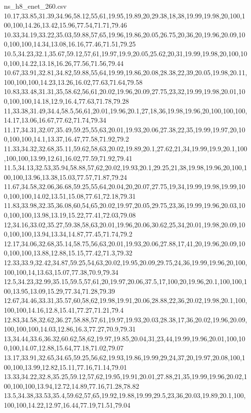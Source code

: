 \begin{filecontents*}[overwrite]{ns_h8_enet_260.csv}
10.17,33.85,31.39,34.96,58.12,55,61,19.95,19.89,20,29.38,18,38,19.99,19.98,20,100,100,100,14.26,13.42,15.96,77.54,71.71,79.46
10.33,34.19,33.22,35.03,59.88,57,65,19.96,19.86,20.05,26.75,20,36,20,19.96,20.09,100,100,100,14.34,13.08,16.16,77.46,71.51,79.25
10.5,34.23,32.1,35.67,59.12,57,61,19.97,19.9,20.05,25.62,20,31,19.99,19.98,20,100,100,100,14.22,13.18,16.26,77.56,71.56,79.44
10.67,33.91,32.81,34.82,59.88,55,64,19.99,19.86,20.08,28.38,22,39,20.05,19.98,20.11,100,100,100,14.23,13.26,16.02,77.63,71.64,79.58
10.83,33.48,31.31,35,58.62,56,61,20.02,19.96,20.09,27.75,23,32,19.99,19.98,20.01,100,100,100,14.18,12.9,16.4,77.63,71.78,79.28
11,33.38,31.49,34.4,58.5,56,61,20.01,19.96,20.1,27,18,36,19.98,19.96,20,100,100,100,14.17,13.06,16.67,77.62,71.74,79.34
11.17,34.31,32.07,35.49,59.25,55,63,20.01,19.93,20.06,27.38,22,35,19.99,19.97,20,100,100,100,14.1,13.37,16.47,77.58,71.92,79.2
11.33,34.32,32.68,35.11,59.62,58,63,20.02,19.89,20.1,27.62,21,34,19.99,19.9,20.1,100,100,100,13.99,12.61,16.02,77.59,71.92,79.41
11.5,34.13,32.53,35.94,58.88,57,62,20.02,19.93,20.1,29.25,21,38,19.98,19.96,20,100,100,100,13.96,13.38,15.03,77.57,71.87,79.24
11.67,34.58,32.06,36.68,59.25,55,64,20.04,20,20.07,27.75,19,34,19.99,19.98,19.99,100,100,100,14.02,13.51,15.08,77.61,72.18,79.31
11.83,33.98,32.35,36.08,60,54,65,20.02,19.97,20.05,29.75,23,36,19.99,19.96,20.03,100,100,100,13.98,13.19,15.22,77.41,72.03,79.08
12,34.16,33.02,35.27,59.38,58,63,20.01,19.96,20.06,30.62,25,34,20.01,19.98,20.09,100,100,100,13.94,13.34,14.87,77.45,71.74,79.2
12.17,34.06,32.68,35.14,58.75,56,63,20.01,19.93,20.06,27.88,17,41,20,19.96,20.09,100,100,100,13.88,12.88,15.15,77.42,71.3,79.32
12.33,33.9,32.42,34.87,59.25,54,63,20.02,19.95,20.09,29.75,24,36,19.99,19.96,20,100,100,100,14,13.63,15.07,77.38,70.9,79.34
12.5,34.23,32.99,35.15,59.5,57,61,20,19.97,20.06,37.5,17,100,20,19.96,20.1,100,100,100,13.95,13.09,15.29,77.34,71.28,79.39
12.67,34.46,33.31,35.57,60,58,62,19.98,19.91,20.06,28.88,22,36,20.02,19.98,20.1,100,100,100,14.16,12.8,15.41,77.27,71.21,79.4
12.83,34.58,32.62,36.27,58.88,57,61,19.97,19.93,20.03,28.38,17,36,20.02,19.96,20.09,100,100,100,14.03,12.86,16.3,77.27,70.9,79.31
13,34.44,33.6,36.32,60.62,58,62,19.97,19.85,20.04,31,23,44,19.99,19.96,20.01,100,100,100,14.07,12.88,15.64,77.18,71.02,79.07
13.17,33.91,32.65,34.65,59.25,56,62,19.93,19.86,19.99,29,24,37,20,19.97,20.08,100,100,100,13.99,12.82,15.11,77.16,71.14,79.01
13.33,34.22,32.8,35.25,59.12,57,62,19.95,19.91,20.01,27.88,21,35,19.99,19.96,20.02,100,100,100,13.94,12.72,14.89,77.16,71.28,78.82
13.5,34.38,33.53,35.4,59.62,57,65,19.92,19.88,19.99,29.5,23,36,20.03,19.89,20.1,100,100,100,14.22,12.97,16.44,77.19,71.51,79.04

\end{filecontents*}
